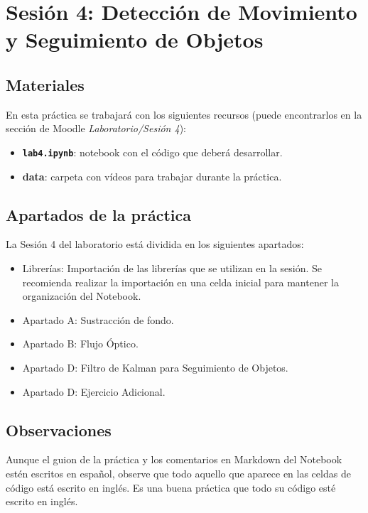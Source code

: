 \chapter{Sesión 4: Detección de Movimiento y Seguimiento de Objetos}
\label{chapter:introduction_ses_4}

\section{Materiales}

En esta práctica se trabajará con los siguientes recursos (puede encontrarlos en la sección de Moodle \textit{Laboratorio/Sesión 4}):

\begin{itemize}
    \item \textbf{\texttt{lab4.ipynb}}: notebook con el código que deberá desarrollar.
    \item \textbf{data}: carpeta con vídeos para trabajar durante la práctica.
\end{itemize}

\section{Apartados de la práctica}

La Sesión 4 del laboratorio está dividida en los siguientes apartados:

\begin{itemize}
    \item Librerías: Importación de las librerías que se utilizan en la sesión. Se recomienda realizar la importación en una celda inicial para mantener la organización del Notebook.
    \item Apartado A: Sustracción de fondo.
    \item Apartado B: Flujo Óptico.
    \item Apartado D: Filtro de Kalman para Seguimiento de Objetos.
    \item Apartado D: Ejercicio Adicional.
\end{itemize}

\section{Observaciones}

Aunque el guion de la práctica y los comentarios en Markdown del Notebook estén escritos en español, observe que todo aquello que aparece en las celdas de código está escrito en inglés. Es una buena práctica que todo su código esté escrito en inglés.

